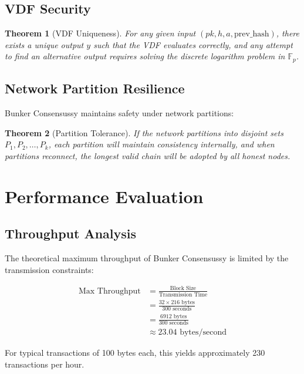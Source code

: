 \documentclass[11pt,a4paper]{article}
\newtheorem{theorem}{Theorem}[section]
\begin{document}
\subsection{VDF Security}

\begin{theorem}[VDF Uniqueness]
For any given input $(pk, h, a, \text{prev\_hash})$, there exists a unique output $y$ such that the VDF evaluates correctly, and any attempt to find an alternative output requires solving the discrete logarithm problem in $\mathbb{F}_p$.
\end{theorem}

\subsection{Network Partition Resilience}

Bunker Consensussy maintains safety under network partitions:

\begin{theorem}[Partition Tolerance]
If the network partitions into disjoint sets $P_1, P_2, \ldots, P_k$, each partition will maintain consistency internally, and when partitions reconnect, the longest valid chain will be adopted by all honest nodes.
\end{theorem}

\section{Performance Evaluation}

\subsection{Throughput Analysis}

The theoretical maximum throughput of Bunker Consensussy is limited by the transmission constraints:

\begin{align}
\text{Max Throughput} &= \frac{\text{Block Size}}{\text{Transmission Time}}\\
&= \frac{32 \times 216 \text{ bytes}}{300 \text{ seconds}}\\
&= \frac{6912 \text{ bytes}}{300 \text{ seconds}}\\
&\approx 23.04 \text{ bytes/second}
\end{align}

For typical transactions of 100 bytes each, this yields approximately 230 transactions per hour.
\end{document}

